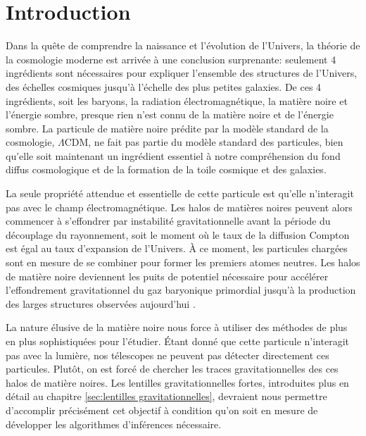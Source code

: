 \chapter{Introduction}\label{chap:intro}
\glsaddall
\thispagestyle{empty}


Dans la quête de comprendre la naissance et l'évolution de l'Univers, la théorie de la cosmologie moderne 
est arrivée à une conclusion surprenante: seulement 4 ingrédients sont nécessaires pour 
expliquer l'ensemble des structures de l'Univers, des échelles cosmiques jusqu'à l'échelle 
des plus petites galaxies. De ces 4 ingrédients, soit les baryons, la radiation électromagnétique, 
la matière noire et l'énergie sombre, presque rien n'est connu de la matière noire et de l'énergie sombre. 
La particule de matière noire prédite par la modèle standard de la cosmologie, $\Lambda$CDM, ne 
fait pas partie du modèle standard des particules, bien qu'elle soit maintenant un ingrédient 
essentiel à notre compréhension du fond diffus cosmologique \citep{PlanckCollaboration2018} 
et de la formation de la toile cosmique et des galaxies.

La seule propriété attendue et essentielle de cette particule est qu'elle n'interagit pas avec le champ 
électromagnétique. Les halos de matières noires peuvent alors commencer à s'effondrer par 
 instabilité gravitationnelle avant la période du 
découplage du rayonnement, soit le moment où le taux de la diffusion Compton est égal au taux d'expansion de l'Univers. 
À ce moment, les particules chargées sont en mesure de se combiner pour former les premiers atomes neutres. 
Les halos de matière noire deviennent les puits de potentiel nécessaire pour accélérer l'effondrement 
gravitationnel du gaz baryonique primordial jusqu'à la production des larges structures observées aujourd'hui \citep{White1979}.

La nature élusive de la matière noire nous force à utiliser des méthodes de plus en plus sophistiquées 
pour l'étudier. Étant donné que cette particule n'interagit pas avec la lumière, nos télescopes 
ne peuvent pas détecter directement ces particules. Plutôt, on est forcé de chercher les traces 
gravitationnelles des ces halos de matière noires. Les lentilles gravitationnelles fortes, introduites 
plus en détail au chapitre \ref{sec:lentilles gravitationnelles}, devraient nous permettre 
d'accomplir précisément cet objectif à condition qu'on soit en mesure de développer les algorithmes d'inférences 
nécessaire.

